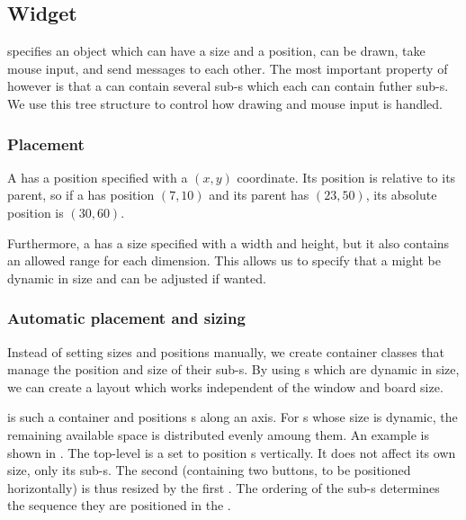 
\subsection{Widget}
\label{sec:widget}

 specifies an object which can have a size and a position, can be
drawn, take mouse input, and send messages to each other. The most important
property of  however is that a  can contain
several sub-s which each can contain futher sub-s. 
We use this tree structure to control how drawing and mouse input is handled.

\subsubsection{Placement}

A  has a position specified with a $(x, y)$ coordinate. Its
position is relative to its parent, so if a  has position
$(7, 10)$ and its parent has $(23, 50)$, its absolute position is $(30, 60)$.

Furthermore, a  has a size specified with a width and height,
but it also contains an allowed range for each dimension. This allows us to
specify that a  might be dynamic in size and can be adjusted if
wanted.

\subsubsection{Automatic placement and sizing}

Instead of setting sizes and positions manually, we create container classes
that manage the position and size of their sub-s. By using
s which are dynamic in size, we can create a layout which works
independent of the window and board size.

 is such a container  and positions
s along an axis. For s whose size is dynamic,
the remaining available space is distributed evenly amoung them. An example is
shown in . The top-level  is a
 set to position s vertically. It does
not affect its own size, only its sub-s. The second
 (containing two buttons, to be positioned
horizontally) is thus resized by the first . The
ordering of the sub-s determines the sequence they are
positioned in the .

